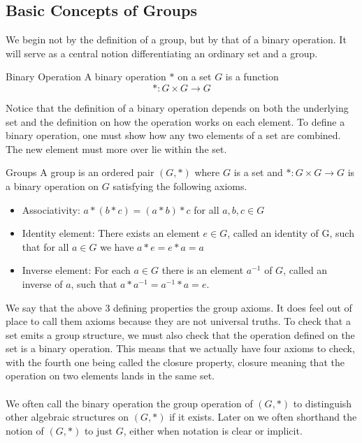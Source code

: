 \documentclass[a4paper]{article}
\begin{document}
\subsection{Basic Concepts of Groups}
We begin not by the definition of a group, but by that of a binary operation. It will serve as a central notion differentiating an ordinary set and a group. 

\begin{defn}{Binary Operation}{} A binary operation $\ast$ on a set $G$ is a function $$\ast:G\times G\to G$$
\end{defn}

Notice that the definition of a binary operation depends on both the underlying set and the definition on how the operation works on each element. To define a binary operation, one must show how any two elements of a set are combined. The new element must more over lie within the set. 

\begin{defn}{Groups}{} A group is an ordered pair $(G,\ast)$ where $G$ is a set and $\ast:G\times G\to G$ is a binary operation on $G$ satisfying the following axioms. 
\begin{itemize}
\item Associativity: $a\ast(b\ast c)=(a\ast b)\ast c$ for all $a,b,c\in G$
\item Identity element: There exists an element $e\in G$, called an identity of G, such that for all $a\in G$ we have $a\ast e=e\ast a=a$
\item Inverse element: For each $a\in G$ there is an element $a^{-1}$ of $G$, called an inverse of $a$, such that $a\ast a^{-1}=a^{-1}\ast a=e$. 
\end{itemize}
\end{defn}

We say that the above 3 defining properties the group axioms. It does feel out of place to call them axioms because they are not universal truths. To check that a set emits a group structure, we must also check that the operation defined on the set is a binary operation. This means that we actually have four axioms to check, with the fourth one being called the closure property, closure meaning that the operation on two elements lands in the same set. \\~\\

We often call the binary operation the group operation of $(G,\ast)$ to distinguish other algebraic structures on $(G,\ast)$ if it exists. Later on we often shorthand the notion of $(G,\ast)$ to just $G$, either when notation is clear or implicit. 
\end{document}
